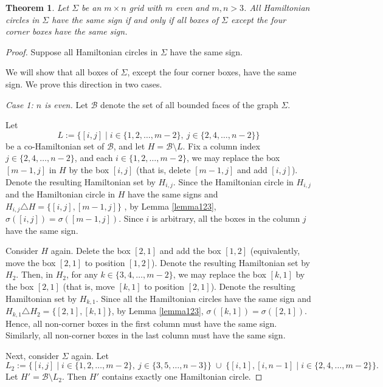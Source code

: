 \documentclass[12pt]{amsart}
\theoremstyle{theorem}%
\newtheorem{theorem}{Theorem}[section]
\theoremstyle{definition}%
\begin{document}
\begin{theorem}\label{thm:all-same-sign}
Let $\Sigma$ be an $m\times n$ grid with $m$ even and $m,n>3$.
 All Hamiltonian circles in $\Sigma$ have the same sign if and only if all boxes of $\Sigma$ except the four corner boxes have the same sign.
\end{theorem}


\begin{proof}
Suppose all Hamiltonian circles in $\Sigma$  have the same sign.



We will show  that all boxes of $\Sigma$, except the four corner boxes, have the same sign.
We prove this direction in two cases.

\medskip
\noindent\emph{Case 1: $n$ is even.}
Let $\mathcal{B}$ denote the set of all bounded faces of the graph $\Sigma$.

Let
\[
L:=\{[i,j]\mid i\in \{1,2,\dots,m-2\},\ j\in \{2,4,\dots,n-2\}\}
\]
be a co-Hamiltonian set of $\mathcal{B}$, and let $H=\mathcal{B}\setminus L$.
Fix a column index  $j\in\{2,4,\dots,n-2\}$, and each $i\in\{1,2,\dots,m-2\}$,
we may replace the box $[m-1,j]$ in $H$ by the box $[i,j]$
(that is, delete $[m-1,j]$ and add $[i,j]$).
Denote the resulting Hamiltonian set by $H_{i,j}$.
 Since the Hamiltonian circle in $H_{i,j}$
and the Hamiltonian circle in $H$ have the same signs and $H_{i,j}\triangle H=\{[i,j],[m-1,j]\}$ , by Lemma \ref{lemma123}, $\sigma([i,j])=\sigma([m-1,j])$. Since $i$ is arbitrary, all the boxes in the column $j$ have the same sign. 


Consider $H$ again. Delete the box $[2,1]$ and add the box $[1,2]$
(equivalently, move the box $[2,1]$ to position $[1,2]$).
Denote the resulting Hamiltonian set by $H_2$.
Then, in $H_2$, for any $k\in\{3,4,\dots,m-2\}$, we may replace the box $[k,1]$
by the box $[2,1]$ (that is, move $[k,1]$ to position $[2,1]$).
Denote the resulting Hamiltonian set by $H_{k,1}$. Since all the Hamiltonian circles have the same sign and $H_{k,1}\triangle H_2=\{[2,1],[k,1]\}$, by Lemma \ref{lemma123}, $\sigma([k,1])=\sigma([2,1])$. Hence, all non-corner boxes in the first column must have the same sign. Similarly, all non-corner boxes in the last column must have the same sign.



Next, consider $\Sigma$ again. Let
\[
L_2:= \{[i,j]\mid i\in \{1,2,\dots,m-2\},\ j\in \{3,5,\dots,n-3\}\}
\;\cup\;
\{[i,1],[i,n-1]\mid i\in \{2,4,\dots,m-2\}\}.
\]
Let $H'=\mathcal{B}\setminus L_2$.
Then $H'$ contains exactly one Hamiltonian circle.


\end{proof}
\end{document}
